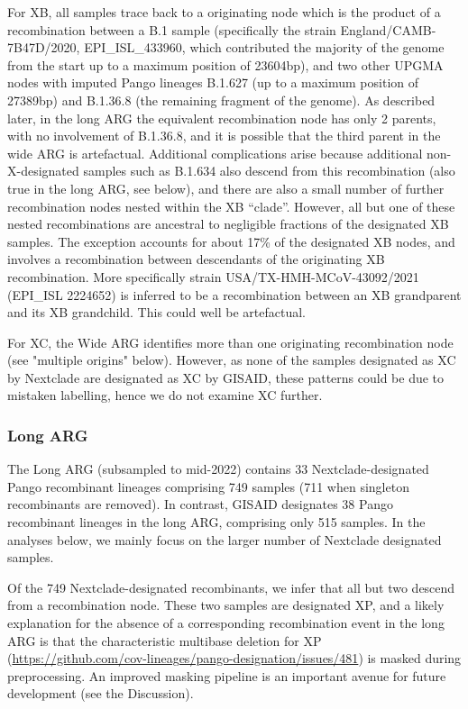 \documentclass{article}
\begin{document}
For XB, all samples trace back to a originating node which is the product of a
recombination between a B.1 sample (specifically the strain
England/CAMB-7B47D/2020, EPI\_ISL\_433960, which contributed the majority of
the genome from the start up to a maximum position of 23604bp), and two other
UPGMA nodes with imputed Pango lineages B.1.627 (up to a maximum position of
27389bp) and B.1.36.8 (the remaining fragment of the genome). As described
later, in the long ARG the equivalent recombination node has only 2 parents,
with no involvement of  B.1.36.8, and it is possible that the third parent in
the wide ARG is artefactual. Additional complications arise because additional
non-X-designated samples such as B.1.634 also descend from this recombination
(also true in the long ARG, see below), and there are also a small number of
further recombination nodes nested within the XB ``clade''. However, all but
one of these nested recombinations are ancestral to negligible fractions
of the designated XB samples. The exception accounts for about 17\% of the
designated XB nodes, and involves a recombination between descendants of the
originating XB recombination. More specifically strain
USA/TX-HMH-MCoV-43092/2021 (EPI\_ISL 2224652) is inferred to be a recombination
between an XB grandparent and its XB grandchild. This could well be
artefactual.

For XC, the Wide ARG identifies more than one originating recombination node
(see "multiple origins" below). However, as none of the samples designated as
XC by Nextclade are designated as XC by GISAID, these patterns could be due to
mistaken labelling, hence we do not examine XC further.

\subsubsection{Long ARG}
The Long ARG (subsampled to mid-2022) contains 33
Nextclade-designated Pango recombinant lineages comprising 749 samples (711 when singleton recombinants are removed). In
contrast, GISAID designates 38 Pango recombinant lineages in the long ARG,
comprising only 515 samples. In the analyses below, we mainly focus on the
larger number of Nextclade designated samples.

Of the 749 Nextclade-designated recombinants, we infer that all but two descend
from a recombination node. These two samples are designated XP, and a likely
explanation for the absence of a corresponding recombination event in the long ARG
is that the characteristic multibase deletion for XP
(\url{https://github.com/cov-lineages/pango-designation/issues/481}) is masked
during preprocessing. An improved masking pipeline is an important avenue for
future development (see the Discussion).
\end{document}
